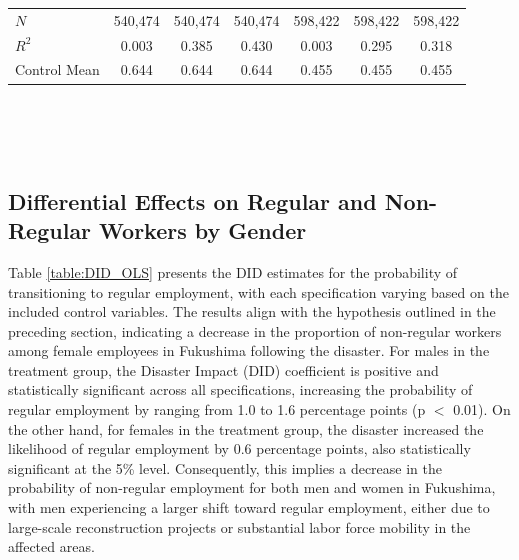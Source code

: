 \documentclass[a4paper,12pt]{article}
\begin{document}
\begin{table}[htbp]
{\begin{tabular}{@{}l*{6}{c}@{}}
$\textit{N}$&  540,474         &  540,474         &  540,474         &  598,422         &  598,422         &  598,422         \\
$\textit{R}^2$&    0.003         &    0.385         &    0.430         &    0.003         &    0.295         &    0.318         \\
Control Mean&    0.644         &    0.644         &    0.644         &    0.455         &    0.455         &    0.455         \\
\bottomrule
\end{tabular}}
\\\\
\\
\label{table:DID_Employment_Status}

\end{table}


\subsection{Differential Effects on Regular and Non-Regular Workers by Gender}

Table \ref{table:DID_OLS} presents the DID estimates for the probability of transitioning to regular employment, with each specification varying based on the included control variables. The results align with the hypothesis outlined in the preceding section, indicating a decrease in the proportion of non-regular workers among female employees in Fukushima following the disaster. For males in the treatment group, the Disaster Impact (DID) coefficient is positive and statistically significant across all specifications, increasing the probability of regular employment by ranging from 1.0 to 1.6 percentage points (p $<$ 0.01). On the other hand, for females in the treatment group, the disaster increased the likelihood of regular employment by 0.6 percentage points, also statistically significant at the 5\% level. Consequently, this implies a decrease in the probability of non-regular employment for both men and women in Fukushima, with men experiencing a larger shift toward regular employment, either due to large-scale reconstruction projects or substantial labor force mobility in the affected areas.
\end{document}

